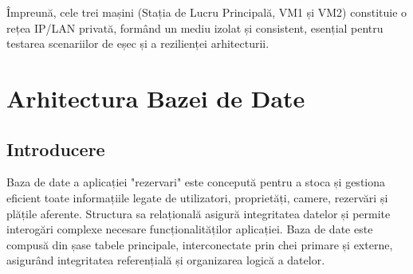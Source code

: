 \documentclass[12pt, a4paper, oneside, romanian]{teza-upb}
\begin{document}
Împreună, cele trei mașini (Stația de Lucru Principală, VM1 și VM2) constituie o rețea IP/LAN privată, formând un mediu izolat și consistent, esențial pentru testarea scenariilor de eșec și a rezilienței arhitecturii.


\section{Arhitectura Bazei de Date}

\subsection{Introducere}
Baza de date a aplicației "rezervari" este concepută pentru a stoca și gestiona eficient toate informațiile legate de utilizatori, proprietăți, camere, rezervări și plățile aferente. Structura sa relațională asigură integritatea datelor și permite interogări complexe necesare funcționalităților aplicației. Baza de date este compusă din șase tabele principale, interconectate prin chei primare și externe, asigurând integritatea referențială și organizarea logică a datelor.
\end{document}
